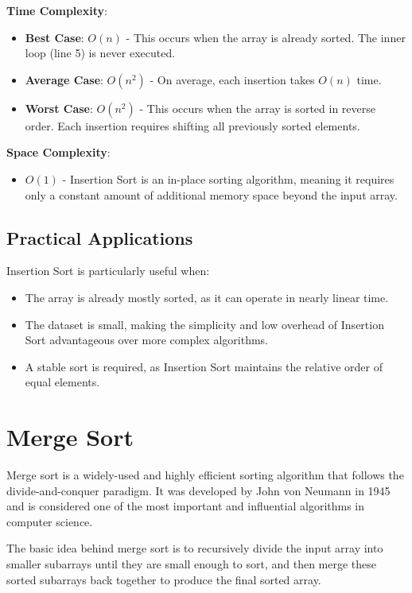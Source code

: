 \documentclass[sigplan,screen]{acmart}
\begin{document}
\textbf{Time Complexity}:
\begin{itemize}
    \item \textbf{Best Case}: $O(n)$ - This occurs when the array is already sorted. The inner loop (line 5) is never executed.
    \item \textbf{Average Case}: $O(n^2)$ - On average, each insertion takes $O(n)$ time.
    \item \textbf{Worst Case}: $O(n^2)$ - This occurs when the array is sorted in reverse order. Each insertion requires shifting all previously sorted elements.
\end{itemize}

\textbf{Space Complexity}:
\begin{itemize}
    \item $O(1)$ - Insertion Sort is an in-place sorting algorithm, meaning it requires only a constant amount of additional memory space beyond the input array.
\end{itemize}

\subsection{Practical Applications}

Insertion Sort is particularly useful when:
\begin{itemize}
    \item The array is already mostly sorted, as it can operate in nearly linear time.
    \item The dataset is small, making the simplicity and low overhead of Insertion Sort advantageous over more complex algorithms.
    \item A stable sort is required, as Insertion Sort maintains the relative order of equal elements.
\end{itemize}



\section{Merge Sort}
Merge sort is a widely-used and highly efficient sorting algorithm that follows the divide-and-conquer paradigm. It was developed by John von Neumann in 1945 and is considered one of the most important and influential algorithms in computer science.

The basic idea behind merge sort is to recursively divide the input array into smaller subarrays until they are small enough to sort, and then merge these sorted subarrays back together to produce the final sorted array.
\end{document}
